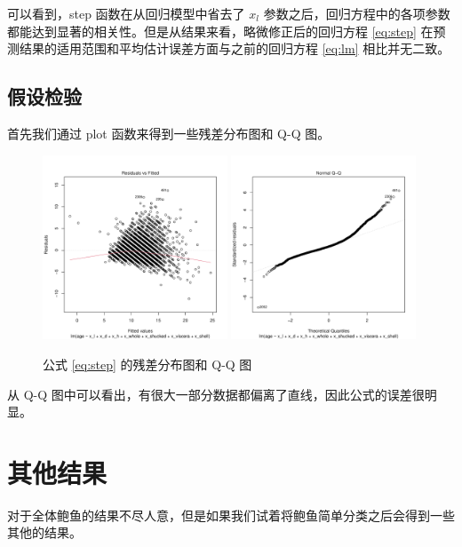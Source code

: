 可以看到，step 函数在从回归模型中省去了 $x_l$ 参数之后，回归方程中的各项参数都能达到显著的相关性。但是从结果来看，略微修正后的回归方程 \ref{eq:step} 在预测结果的适用范围和平均估计误差方面与之前的回归方程 \ref{eq:lm} 相比并无二致。

\subsection{假设检验}

首先我们通过 plot 函数来得到一些残差分布图和 Q-Q 图。

\begin{figure}[htbp]
\centering
\includegraphics[width=0.49\textwidth]{figures/lm.step-1.png}
\includegraphics[width=0.49\textwidth]{figures/lm.step-2.png}
\caption{公式 \ref{eq:step} 的残差分布图和 Q-Q 图}
\label{fig:lm_residuals}
\end{figure}

从 Q-Q 图中可以看出，有很大一部分数据都偏离了直线，因此公式的误差很明显。

\section{其他结果}

对于全体鲍鱼的结果不尽人意，但是如果我们试着将鲍鱼简单分类之后会得到一些其他的结果。

